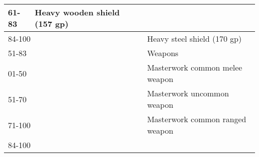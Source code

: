 \begin{longtable}{llll}
{\begin{minipage}[t]{3.276in}
61-83\end{minipage}} & \multicolumn{1}{|p{0.896in}|}{\begin{minipage}[t]{0.896in}\raggedright
Heavy wooden shield (157 gp)\end{minipage}}\\
\hline
\multicolumn{3}{p{3.276in}|}{\begin{minipage}[t]{3.276in}\raggedright
84-100\end{minipage}} & \multicolumn{1}{|p{0.896in}|}{\begin{minipage}[t]{0.896in}\raggedright
Heavy steel shield (170 gp)\end{minipage}}\\
\hline
\multicolumn{3}{p{3.276in}|}{\begin{minipage}[t]{3.276in}\raggedright
51-83\end{minipage}} & \multicolumn{1}{|p{0.896in}|}{\begin{minipage}[t]{0.896in}\raggedright
Weapons\end{minipage}}\\
\hline
\multicolumn{3}{p{3.276in}|}{\begin{minipage}[t]{3.276in}\raggedright
01-50\end{minipage}} & \multicolumn{1}{|p{0.896in}|}{\begin{minipage}[t]{0.896in}\raggedright
Masterwork common melee weapon\end{minipage}}\\
\hline
\multicolumn{3}{p{3.276in}|}{\begin{minipage}[t]{3.276in}\raggedright
51-70\end{minipage}} & \multicolumn{1}{|p{0.896in}|}{\begin{minipage}[t]{0.896in}\raggedright
Masterwork uncommon weapon\end{minipage}}\\
\hline
\multicolumn{3}{p{3.276in}|}{\begin{minipage}[t]{3.276in}\raggedright
71-100\end{minipage}} & \multicolumn{1}{|p{0.896in}|}{\begin{minipage}[t]{0.896in}\raggedright
Masterwork common ranged weapon\end{minipage}}\\
\hline
\multicolumn{3}{p{3.276in}|}{\begin{minipage}[t]{3.276in}\raggedright
84-100\end{minipage}} & \multicolumn{1}{|p{0.896in}|}{\begin{minipage}[t]{0.896in}\raggedright

\end{minipage}}
\end{longtable}
